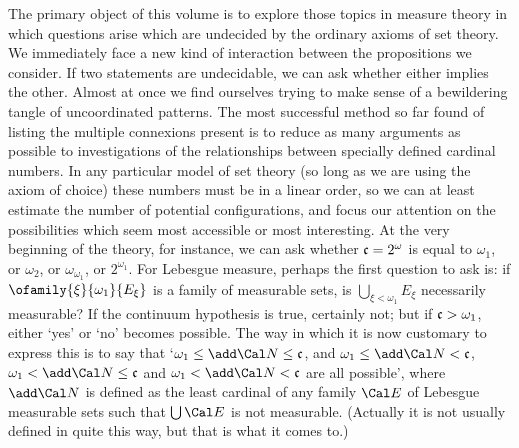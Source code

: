       
\def\chaptername{Cardinal functions} 
      
The primary object of this volume is to explore those topics in measure 
theory in which questions arise which are undecided by the ordinary 
axioms of set theory.   We immediately face a new kind of interaction 
between the propositions we consider.   If two statements are 
undecidable, we can ask whether either implies the other.   Almost at 
once we find ourselves trying to make sense of a bewildering tangle of 
uncoordinated patterns.   The most successful method so far found of 
listing the multiple connexions present is to reduce as many arguments 
as possible to investigations of the relationships between specially 
defined cardinal numbers.   In any particular model of set theory (so 
long as we are using the axiom of choice) these numbers must be in a 
linear order, so we can at least estimate the number of potential 
configurations, and focus our attention on the possibilities which seem 
most accessible or most interesting.   At the very beginning of the 
theory, for instance, we can ask whether $\frak c=2^{\omega}$ is equal 
to $\omega_1$, or $\omega_2$, or $\omega_{\omega_1}$, or $2^{\omega_1}$. 
For Lebesgue measure, perhaps the first question to ask is:  if 
$\ofamily{\xi}{\omega_1}{E_{\xi}}$ is a family of measurable sets, is 
$\bigcup_{\xi<\omega_1}E_{\xi}$ necessarily measurable?   If the 
continuum hypothesis is true, certainly not;  but if $\frak c>\omega_1$, 
either `yes' or `no' becomes possible.   The way in which it is now 
customary to express this is to say that 
`$\omega_1\le\add\Cal N\le\frak c$, and $\omega_1\le\add\Cal N<\frak c$, 
$\omega_1<\add\Cal N\le\frak c$ and $\omega_1<\add\Cal N<\frak c$ are 
all possible', where $\add\Cal N$ is defined as the least cardinal of 
any family $\Cal E$ of Lebesgue measurable sets such that 
$\bigcup\Cal E$ is not measurable.   (Actually it is not usually defined 
in quite this way, but that is what it comes to.) 
      
